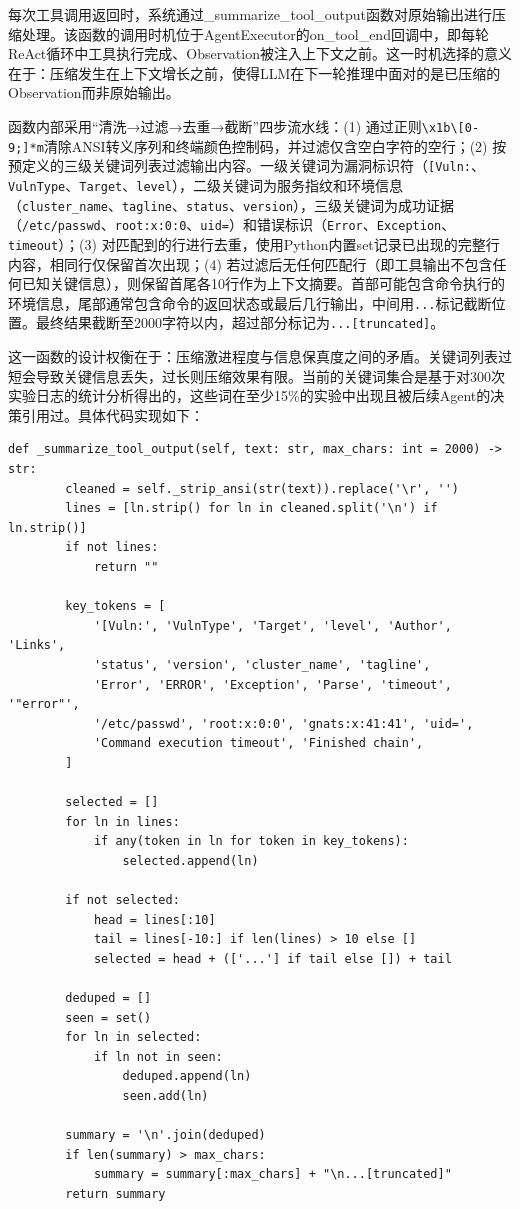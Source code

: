 每次工具调用返回时，系统通过\_summarize\_tool\_output函数对原始输出进行压缩处理。该函数的调用时机位于AgentExecutor的on\_tool\_end回调中，即每轮ReAct循环中工具执行完成、Observation被注入上下文之前。这一时机选择的意义在于：压缩发生在上下文增长之前，使得LLM在下一轮推理中面对的是已压缩的Observation而非原始输出。

函数内部采用“清洗→过滤→去重→截断”四步流水线：(1) 通过正则\texttt{\textbackslash{}x1b\textbackslash{}[0-9;]*m}清除ANSI转义序列和终端颜色控制码，并过滤仅含空白字符的空行；(2) 按预定义的三级关键词列表过滤输出内容。一级关键词为漏洞标识符（\texttt{[Vuln:}、\texttt{VulnType}、\texttt{Target}、\texttt{level}），二级关键词为服务指纹和环境信息（\texttt{cluster\_name}、\texttt{tagline}、\texttt{status}、\texttt{version}），三级关键词为成功证据（\texttt{/etc/passwd}、\texttt{root:x:0:0}、\texttt{uid=}）和错误标识（\texttt{Error}、\texttt{Exception}、\texttt{timeout}）；(3) 对匹配到的行进行去重，使用Python内置set记录已出现的完整行内容，相同行仅保留首次出现；(4) 若过滤后无任何匹配行（即工具输出不包含任何已知关键信息），则保留首尾各10行作为上下文摘要。首部可能包含命令执行的环境信息，尾部通常包含命令的返回状态或最后几行输出，中间用\texttt{...}标记截断位置。最终结果截断至2000字符以内，超过部分标记为\texttt{...[truncated]}。

这一函数的设计权衡在于：压缩激进程度与信息保真度之间的矛盾。关键词列表过短会导致关键信息丢失，过长则压缩效果有限。当前的关键词集合是基于对300次实验日志的统计分析得出的，这些词在至少15\%的实验中出现且被后续Agent的决策引用过。具体代码实现如下：

\begin{Verbatim}[mathescape=false]
def _summarize_tool_output(self, text: str, max_chars: int = 2000) -> str:
        cleaned = self._strip_ansi(str(text)).replace('\r', '')
        lines = [ln.strip() for ln in cleaned.split('\n') if ln.strip()]
        if not lines:
            return ""

        key_tokens = [
            '[Vuln:', 'VulnType', 'Target', 'level', 'Author', 'Links',
            'status', 'version', 'cluster_name', 'tagline',
            'Error', 'ERROR', 'Exception', 'Parse', 'timeout', '"error"',
            '/etc/passwd', 'root:x:0:0', 'gnats:x:41:41', 'uid=',
            'Command execution timeout', 'Finished chain',
        ]

        selected = []
        for ln in lines:
            if any(token in ln for token in key_tokens):
                selected.append(ln)

        if not selected:
            head = lines[:10]
            tail = lines[-10:] if len(lines) > 10 else []
            selected = head + (['...'] if tail else []) + tail

        deduped = []
        seen = set()
        for ln in selected:
            if ln not in seen:
                deduped.append(ln)
                seen.add(ln)

        summary = '\n'.join(deduped)
        if len(summary) > max_chars:
            summary = summary[:max_chars] + "\n...[truncated]"
        return summary
\end{Verbatim}


